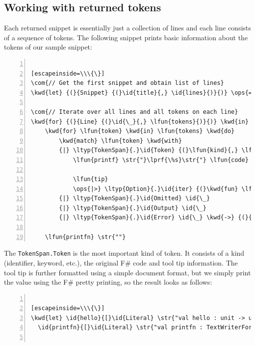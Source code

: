 \documentclass{article}
\newcommand{\id}[1]{\textcolor{black}{#1}}
\newcommand{\com}[1]{\textcolor{officegreen}{#1}}
\newcommand{\kwd}[1]{\textcolor{navy}{#1}}
\newcommand{\ops}[1]{\textcolor{purple}{#1}}
\newcommand{\str}[1]{\textcolor{olive}{#1}}
\begin{document}
\subsection*{Working with returned tokens}



Each returned snippet is essentially just a collection of lines and each line
consists of a sequence of tokens. The following snippet prints basic information
about the tokens of our sample snippet:
\begin{lstlisting}[numbers=left]

[escapeinside=\\\{\}]
\com{// Get the first snippet and obtain list of lines}
\kwd{let} {(}{Snippet} {(}\id{title}{,} \id{lines}{)}{)} \ops{=} \id{snippets} \ops{|>} \ltyp{Seq}{.}\id{head}

\com{// Iterate over all lines and all tokens on each line}
\kwd{for} {(}{Line} {(}\id{\_}{,} \lfun{tokens}{)}{)} \kwd{in} \id{lines} \kwd{do}
    \kwd{for} \lfun{token} \kwd{in} \lfun{tokens} \kwd{do}
        \kwd{match} \lfun{token} \kwd{with}
        {|} \ltyp{TokenSpan}{.}\id{Token} {(}\lfun{kind}{,} \lfun{code}{,} \lfun{tip}{)} \kwd{->}
            \lfun{printf} \str{"}\lprf{\%s}\str{"} \lfun{code}

            \lfun{tip}
            \ops{|>} \ltyp{Option}{.}\id{iter} {(}\kwd{fun} \lfun{spans} \kwd{->} \lfun{printfn} \str{"}\lprf{\%A}\str{"} \lfun{spans}{)}
        {|} \ltyp{TokenSpan}{.}\id{Omitted} \id{\_}
        {|} \ltyp{TokenSpan}{.}\id{Output} \id{\_}
        {|} \ltyp{TokenSpan}{.}\id{Error} \id{\_} \kwd{->} {(}{)}

    \lfun{printfn} \str{""}

\end{lstlisting}



The \texttt{TokenSpan.Token} is the most important kind of token. It consists of a kind
(identifier, keyword, etc.), the original F\# code and tool tip information.
The tool tip is further formatted using a simple document format, but we simply
print the value using the F\# pretty printing, so the result looks as follows:
\begin{lstlisting}[numbers=left]

[escapeinside=\\\{\}]
\kwd{let} \id{hello}{[}\id{Literal} \str{"val hello : unit -> unit"}{;} \ops{..}{.}{]} {(}{)} \ops{=}
  \id{printfn}{[}\id{Literal} \str{"val printfn : TextWriterFormat<'T> -> 'T"}{;} \ops{..}{.}{]} \str{"Hello world"}


\end{lstlisting}
\end{document}
